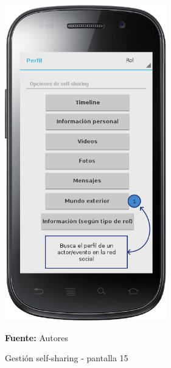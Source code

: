 \begin{figure}[!htb]
  \begin{center}
    \includegraphics[width=7cm]{./imagenes/UI/Self_sharing/self_sharing_15.png}
    \caption{Gestión self-sharing - pantalla 15}
    \label{fig:self_sharing_15}
    \textbf{Fuente:}  Autores
  \end{center}
\end{figure}

